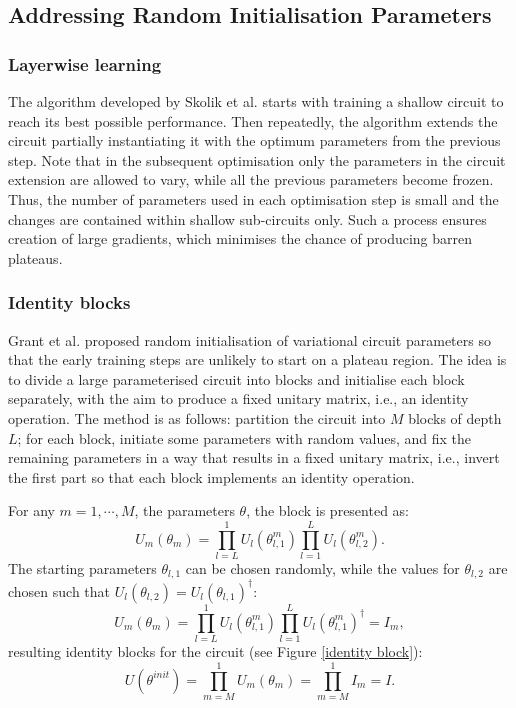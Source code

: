 \subsection{Addressing Random Initialisation Parameters}

\subsubsection{Layerwise learning}
The algorithm developed by Skolik et al. \cite{skolikLayerwiseLearningQuantum2021} starts with training a shallow circuit to reach its best possible performance. Then repeatedly, the algorithm extends the circuit partially instantiating it with the optimum parameters from the previous step. 
Note that in the subsequent optimisation only the parameters in the circuit extension are allowed to vary, while all the previous parameters become frozen.
Thus, the number of parameters used in each optimisation step is small and the changes are contained within shallow sub-circuits only. Such a process ensures creation of large gradients, which minimises the chance of producing barren plateaus.


\subsubsection{Identity blocks}

Grant et al. \cite{grantInitializationStrategyAddressing2019} proposed random initialisation of variational circuit parameters so that the early training steps are unlikely to start on a plateau region. 
The idea is to divide a large parameterised circuit into blocks and initialise each block separately, with the aim to produce a fixed unitary matrix, i.e., an identity operation. 
The method is as follows: partition the circuit into $M$ blocks of depth $L$; for each block, initiate some parameters with random values, and fix the remaining parameters in a way that results in a fixed unitary matrix, i.e., invert the first part so that each block implements an identity operation.

For any $m = 1, \cdots, M$, the parameters $\theta$, the block is presented as:
\begin{equation}
    U_m(\theta_m)
    = \prod_{l=L}^1 U_l(\theta_{l,1}^m) \prod_{l=1}^L U_l(\theta_{l,2}^m).
\end{equation}
The starting parameters $\theta_{l,1}$ can be chosen randomly, while the values for $\theta_{l,2}$ are chosen such that $U_l(\theta_{l,2}) = U_l(\theta_{l,1})^\dagger$:
\begin{equation}
    U_m(\theta_m)
    = \prod_{l=L}^1 U_l(\theta_{l,1}^m)
    \prod_{l=1}^L U_l(\theta_{l,1}^m)^\dagger
    = I_m,
\end{equation}
resulting identity blocks for the circuit (see Figure \ref{identity block}):
\begin{equation}
    U(\theta^{init})
    = \prod_{m=M}^1 U_m(\theta_m)
    = \prod_{m=M}^1 I_m
    = I.
\end{equation}

